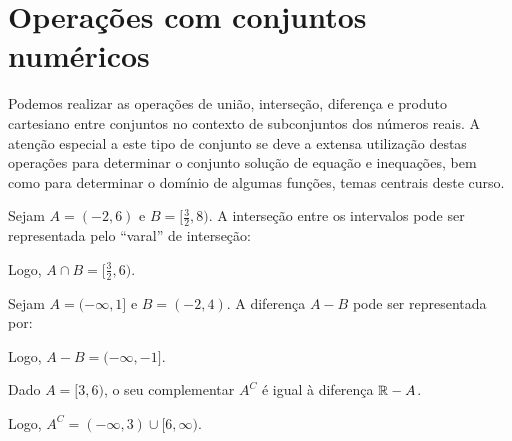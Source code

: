 \section{Operações com conjuntos numéricos}

 Podemos realizar as operações de união, interseção, diferença e produto cartesiano entre conjuntos no contexto de subconjuntos dos números reais. A atenção especial a este tipo de conjunto se deve a extensa utilização destas operações para determinar o conjunto solução de equação e inequações, bem como para determinar o domínio de algumas funções, temas centrais deste curso.

\begin{exem}
    Sejam $A=(-2,6)$ e $B=[\frac{3}{2},8)$. A interseção entre os intervalos pode ser representada pelo ``varal'' de interseção:
    \begin{intervaloper}[3]{-3}{9}
    \end{intervaloper}

    Logo, $A\cap B=[\frac{3}{2},6)$.
\end{exem}

\begin{exem}
    Sejam $A=(-\infty,1]$ e $B=(-2,4)$. A diferença $A-B$  pode ser representada por:
    \begin{intervaloper}[3]{-3}{5}
    \end{intervaloper}

    Logo, $A-B=(-\infty, -1]$.
\end{exem}

\begin{exem}
    Dado $A=[3,6)$, o seu complementar $A^C$ é igual à diferença $\mathbb{R}-A$. 
    \begin{intervaloper}[2]{1.5}{7.5}
    \end{intervaloper}

    Logo, $A^C=(-\infty,3)\cup [6,\infty)$.
\end{exem}

